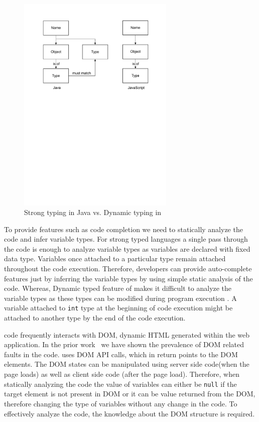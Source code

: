 		\begin{figure}
			\begin{mdframed}
			\centering
			\includegraphics[width=75mm]{images/typing.pdf}
			\end{mdframed}
			\caption{Strong typing in Java vs. Dynamic typing in \javascript}
			\label{Fig:Typing}
		\end{figure}
		
		To provide features such as code completion we need to statically analyze the code and infer variable types. For strong typed languages a single pass through the code is enough to analyze variable types as variables are declared with fixed data type. Variables once attached to a particular type remain attached throughout the code execution. Therefore, developers can provide auto-complete features just by inferring the variable types by using simple static analysis of the code. Whereas, Dynamic typed feature of \javascript makes it difficult to analyze the variable types as these types can be modified during program execution \cite{hackett2012fast, kashyap2013type}. A variable attached to \texttt{int} type at the beginning of code execution might be attached to another type by the end of the code execution. 

	
	 \javascript code frequently interacts with DOM, \ie dynamic HTML generated within the web application. In the prior work~\cite{ocariza2013empirical} we have shown the prevalence of DOM related faults in the \javascript  code. \javascript uses DOM API calls, which in return points to the DOM elements. The DOM states can be manipulated using server side code(when the page loads) as well as client side code (after the page load). Therefore, when statically analyzing the \javascript code the value of variables can either be \texttt{null} if the target element is not present in DOM or it can be value returned from the DOM, therefore changing the type of \javascript variables without any change in the \javascript code. To effectively analyze the \javascript code, the knowledge about the DOM structure is required. 
	
